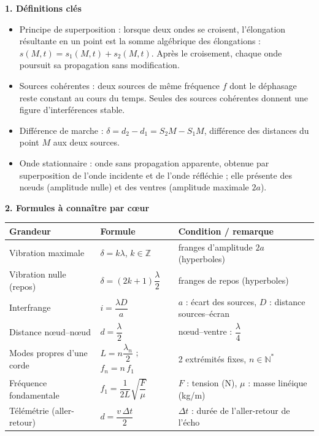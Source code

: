 \documentclass[11pt]{article}
\newcommand{\cle}[1]{{\popxbold\color{popdark}#1}}
\begin{document}
\begin{bilan}
\textbf{1. Définitions clés}
\begin{itemize}
  \item \cle{Principe de superposition} : lorsque deux ondes se croisent, l'élongation résultante en un point est la somme algébrique des élongations : $s(M,t)=s_1(M,t)+s_2(M,t)$. Après le croisement, chaque onde poursuit sa propagation sans modification.
  \item \cle{Sources cohérentes} : deux sources de même fréquence $f$ dont le déphasage reste constant au cours du temps. Seules des sources cohérentes donnent une figure d'interférences stable.
  \item \cle{Différence de marche} : $\delta = d_2 - d_1 = S_2M - S_1M$, différence des distances du point $M$ aux deux sources.
  \item \cle{Onde stationnaire} : onde sans propagation apparente, obtenue par superposition de l'onde incidente et de l'onde réfléchie ; elle présente des \cle{nœuds} (amplitude nulle) et des \cle{ventres} (amplitude maximale $2a$).
\end{itemize}

\textbf{2. Formules à connaître par cœur}
\begin{center}
\begin{tabularx}{\linewidth}{|l|X|X|}
\hline
\rowcolor{popblueL} \textbf{Grandeur} & \textbf{Formule} & \textbf{Condition / remarque} \\
\hline
Vibration maximale & $\delta = k\lambda$, $k\in\mathbb{Z}$ & franges d'amplitude $2a$ (hyperboles) \\
\hline
Vibration nulle (repos) & $\delta = (2k+1)\dfrac{\lambda}{2}$ & franges de repos (hyperboles) \\
\hline
Interfrange & $i = \dfrac{\lambda D}{a}$ & $a$ : écart des sources, $D$ : distance sources--écran \\
\hline
Distance nœud--nœud & $d = \dfrac{\lambda}{2}$ & nœud--ventre : $\dfrac{\lambda}{4}$ \\
\hline
Modes propres d'une corde & $L = n\dfrac{\lambda_n}{2}$ \;;\; $f_n = n\,f_1$ & 2 extrémités fixes, $n\in\mathbb{N}^*$ \\
\hline
Fréquence fondamentale & $f_1 = \dfrac{1}{2L}\sqrt{\dfrac{F}{\mu}}$ & $F$ : tension (N), $\mu$ : masse linéique (kg/m) \\
\hline
Télémétrie (aller-retour) & $d = \dfrac{v\,\Delta t}{2}$ & $\Delta t$ : durée de l'aller-retour de l'écho \\
\hline
\end{tabularx}
\end{center}


\end{bilan}
\end{document}
